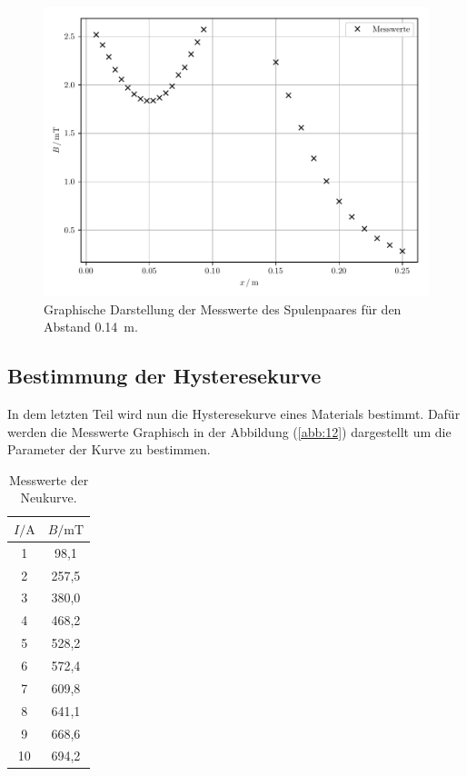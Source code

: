 \begin{figure}[H]
  \centering
  \includegraphics{plot5.pdf}
  \caption{Graphische Darstellung der Messwerte des Spulenpaares für den Abstand \SI{0.14}{\meter}.}
  \label{abb:11}
\end{figure}

\subsection{Bestimmung der Hysteresekurve}

In dem letzten Teil wird nun die Hysteresekurve eines Materials bestimmt. Dafür werden
die Messwerte Graphisch in der Abbildung (\ref{abb:12}) dargestellt um die Parameter
der Kurve zu bestimmen.

\begin{table}
  \centering
  \caption{Messwerte der Neukurve.}
  \label{tab:6}
  \begin{tabular}{c c}
    \toprule
    $I/\si{\ampere}$ & $B/\si{\milli\tesla}$ \\
    \midrule
    1  &  98,1 \\
    2  & 257,5 \\
    3  & 380,0 \\
    4  & 468,2 \\
    5  & 528,2 \\
    6  & 572,4 \\
    7  & 609,8 \\
    8  & 641,1 \\
    9  & 668,6 \\
    10 & 694,2 \\
    \bottomrule
  \end{tabular}
\end{table}

